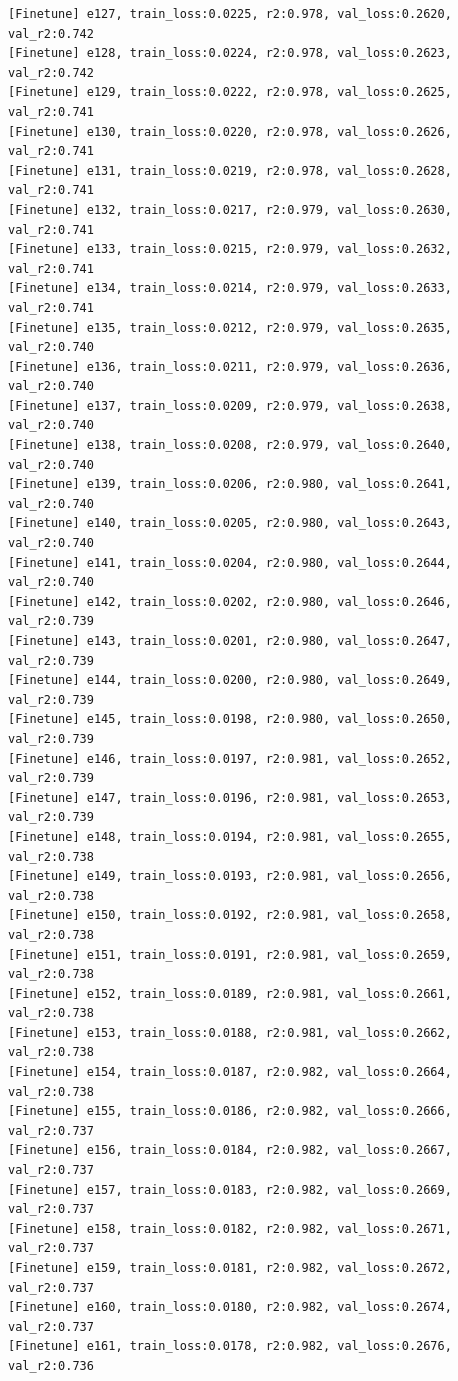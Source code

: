 \documentclass[a4paper, 12pt]{article}
\begin{document}
\begin{lstlisting}
[Finetune] e127, train_loss:0.0225, r2:0.978, val_loss:0.2620, val_r2:0.742
[Finetune] e128, train_loss:0.0224, r2:0.978, val_loss:0.2623, val_r2:0.742
[Finetune] e129, train_loss:0.0222, r2:0.978, val_loss:0.2625, val_r2:0.741
[Finetune] e130, train_loss:0.0220, r2:0.978, val_loss:0.2626, val_r2:0.741
[Finetune] e131, train_loss:0.0219, r2:0.978, val_loss:0.2628, val_r2:0.741
[Finetune] e132, train_loss:0.0217, r2:0.979, val_loss:0.2630, val_r2:0.741
[Finetune] e133, train_loss:0.0215, r2:0.979, val_loss:0.2632, val_r2:0.741
[Finetune] e134, train_loss:0.0214, r2:0.979, val_loss:0.2633, val_r2:0.741
[Finetune] e135, train_loss:0.0212, r2:0.979, val_loss:0.2635, val_r2:0.740
[Finetune] e136, train_loss:0.0211, r2:0.979, val_loss:0.2636, val_r2:0.740
[Finetune] e137, train_loss:0.0209, r2:0.979, val_loss:0.2638, val_r2:0.740
[Finetune] e138, train_loss:0.0208, r2:0.979, val_loss:0.2640, val_r2:0.740
[Finetune] e139, train_loss:0.0206, r2:0.980, val_loss:0.2641, val_r2:0.740
[Finetune] e140, train_loss:0.0205, r2:0.980, val_loss:0.2643, val_r2:0.740
[Finetune] e141, train_loss:0.0204, r2:0.980, val_loss:0.2644, val_r2:0.740
[Finetune] e142, train_loss:0.0202, r2:0.980, val_loss:0.2646, val_r2:0.739
[Finetune] e143, train_loss:0.0201, r2:0.980, val_loss:0.2647, val_r2:0.739
[Finetune] e144, train_loss:0.0200, r2:0.980, val_loss:0.2649, val_r2:0.739
[Finetune] e145, train_loss:0.0198, r2:0.980, val_loss:0.2650, val_r2:0.739
[Finetune] e146, train_loss:0.0197, r2:0.981, val_loss:0.2652, val_r2:0.739
[Finetune] e147, train_loss:0.0196, r2:0.981, val_loss:0.2653, val_r2:0.739
[Finetune] e148, train_loss:0.0194, r2:0.981, val_loss:0.2655, val_r2:0.738
[Finetune] e149, train_loss:0.0193, r2:0.981, val_loss:0.2656, val_r2:0.738
[Finetune] e150, train_loss:0.0192, r2:0.981, val_loss:0.2658, val_r2:0.738
[Finetune] e151, train_loss:0.0191, r2:0.981, val_loss:0.2659, val_r2:0.738
[Finetune] e152, train_loss:0.0189, r2:0.981, val_loss:0.2661, val_r2:0.738
[Finetune] e153, train_loss:0.0188, r2:0.981, val_loss:0.2662, val_r2:0.738
[Finetune] e154, train_loss:0.0187, r2:0.982, val_loss:0.2664, val_r2:0.738
[Finetune] e155, train_loss:0.0186, r2:0.982, val_loss:0.2666, val_r2:0.737
[Finetune] e156, train_loss:0.0184, r2:0.982, val_loss:0.2667, val_r2:0.737
[Finetune] e157, train_loss:0.0183, r2:0.982, val_loss:0.2669, val_r2:0.737
[Finetune] e158, train_loss:0.0182, r2:0.982, val_loss:0.2671, val_r2:0.737
[Finetune] e159, train_loss:0.0181, r2:0.982, val_loss:0.2672, val_r2:0.737
[Finetune] e160, train_loss:0.0180, r2:0.982, val_loss:0.2674, val_r2:0.737
[Finetune] e161, train_loss:0.0178, r2:0.982, val_loss:0.2676, val_r2:0.736

\end{lstlisting}
\end{document}
